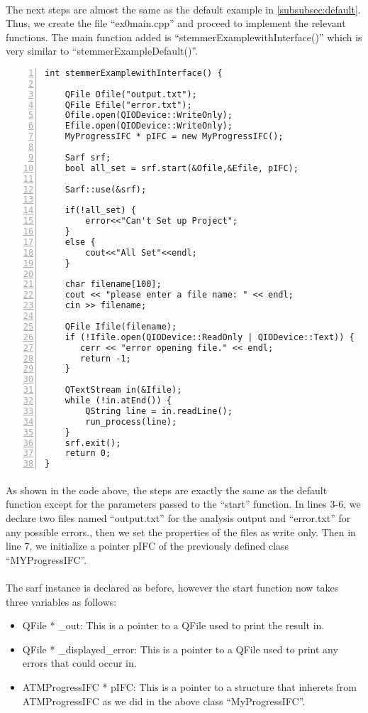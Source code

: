 \documentclass{article}
\begin{document}
\paragraph{}
The next steps are almost the same as the default example in \ref{subsubsec:default}. Thus, we create the file ``ex0main.cpp'' and proceed to implement the relevant functions. The main function added is ``stemmerExamplewithInterface()'' which is very similar to ``stemmerExampleDefault()''.

\begin{Verbatim}[numbers=left]
int stemmerExamplewithInterface() {

    QFile Ofile("output.txt");
    QFile Efile("error.txt");
    Ofile.open(QIODevice::WriteOnly);
    Efile.open(QIODevice::WriteOnly);
    MyProgressIFC * pIFC = new MyProgressIFC();

    Sarf srf;
    bool all_set = srf.start(&Ofile,&Efile, pIFC);

    Sarf::use(&srf);

    if(!all_set) {
        error<<"Can't Set up Project";
    }
    else {
        cout<<"All Set"<<endl;
    }

    char filename[100];
    cout << "please enter a file name: " << endl;
    cin >> filename;

    QFile Ifile(filename);
    if (!Ifile.open(QIODevice::ReadOnly | QIODevice::Text)) {
       cerr << "error opening file." << endl;
       return -1;
    }

    QTextStream in(&Ifile);
    while (!in.atEnd()) {
        QString line = in.readLine();
        run_process(line);
    }
    srf.exit();
    return 0;
}
\end{Verbatim}

\paragraph{}
As shown in the code above, the steps are exactly the same as the default function except for the parameters passed to the ``start'' function. In lines 3-6, we declare two files named ``output.txt'' for the analysis output and ``error.txt'' for any possible errors., then we set the properties of the files as write only. Then in line 7, we initialize a pointer pIFC of the previously defined class ``MYProgressIFC''.

\paragraph{}
The sarf instance is declared as before, however the start function now takes three variables as follows:
\begin{itemize}
\item QFile * \_out: This is a pointer to a QFile used to print the result in.
\item QFile * \_displayed\_error: This is a pointer to a QFile used to print any errors that could occur in.
\item ATMProgressIFC * pIFC: This is a pointer to a structure that inherets from ATMProgressIFC as we did in the above class ``MyProgressIFC''.
\end{itemize}
\end{document}
